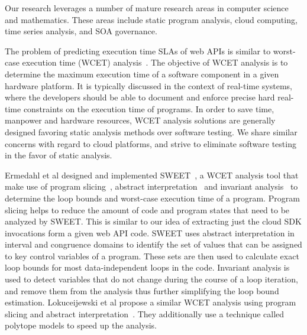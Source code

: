 Our research leverages a number of mature research areas in computer 
science and mathematics. These areas include static program analysis, 
cloud computing, time series analysis,
and SOA governance.

The problem of predicting execution time SLAs of web APIs 
is similar to worst-case execution
time (WCET) analysis~\cite{Wilhelm:2008:WEP:1347375.1347389,ermedahl2007loop,Sandberg:2006:FWF:1134650.1134666,Muchnick:1998:ACD:286076,Frost:2011:WAJ:2043910.2043916}. 
The objective of WCET analysis is to determine the maximum execution time of a software component in a given hardware platform. It is 
typically discussed in the context of real-time systems, where the developers should be able to document
and enforce precise hard real-time constraints on the execution time of programs. In order to save time, 
manpower and hardware resources, WCET analysis solutions are generally designed favoring static
analysis methods over software testing. We share similar concerns with regard to cloud platforms,
and strive to eliminate software testing in the favor of static analysis. 

Ermedahl et al designed and implemented SWEET~\cite{ermedahl2007loop}, a WCET analysis tool that make use of program slicing~\cite{Sandberg:2006:FWF:1134650.1134666},
 abstract interpretation~\cite{Cousot:1977:AIU:512950.512973} and invariant analysis~\cite{Muchnick:1998:ACD:286076} to determine the loop bounds and worst-case execution time 
 of a program. Program slicing helps to reduce the amount of code and program states that need to be 
 analyzed by SWEET. This is similar to our idea of extracting just the cloud SDK invocations form 
 a given web API code. SWEET uses abstract interpretation in interval and congruence domains to identify
 the set of values that can be assigned to key control variables of a program. These sets are then
 used to calculate exact loop bounds for most data-independent loops in the code. Invariant analysis  is
 used to detect variables that do not change during the course of a loop iteration, and remove them from
 the analysis thus further simplifying the loop bound estimation. Lokuceijewski et al propose 
 a similar WCET analysis using program slicing and abstract interpretation~\cite{Lokuciejewski:2009:FPS:1545006.1545064}. They additionally use a technique
called polytope models to speed up the analysis.  
 
